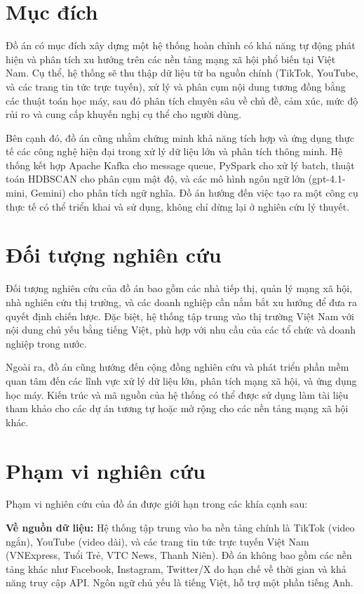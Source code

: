 \section{Mục đích}

Đồ án có mục đích xây dựng một hệ thống hoàn chỉnh có khả năng tự động phát hiện và phân tích xu hướng trên các nền tảng mạng xã hội phổ biến tại Việt Nam. Cụ thể, hệ thống sẽ thu thập dữ liệu từ ba nguồn chính (TikTok, YouTube, và các trang tin tức trực tuyến), xử lý và phân cụm nội dung tương đồng bằng các thuật toán học máy, sau đó phân tích chuyên sâu về chủ đề, cảm xúc, mức độ rủi ro và cung cấp khuyến nghị cụ thể cho người dùng.

Bên cạnh đó, đồ án cũng nhằm chứng minh khả năng tích hợp và ứng dụng thực tế các công nghệ hiện đại trong xử lý dữ liệu lớn và phân tích thông minh. Hệ thống kết hợp Apache Kafka cho message queue, PySpark cho xử lý batch, thuật toán HDBSCAN cho phân cụm mật độ, và các mô hình ngôn ngữ lớn (gpt-4.1-mini, Gemini) cho phân tích ngữ nghĩa. Đồ án hướng đến việc tạo ra một công cụ thực tế có thể triển khai và sử dụng, không chỉ dừng lại ở nghiên cứu lý thuyết.

\section{Đối tượng nghiên cứu}

Đối tượng nghiên cứu của đồ án bao gồm các nhà tiếp thị, quản lý mạng xã hội, nhà nghiên cứu thị trường, và các doanh nghiệp cần nắm bắt xu hướng để đưa ra quyết định chiến lược. Đặc biệt, hệ thống tập trung vào thị trường Việt Nam với nội dung chủ yếu bằng tiếng Việt, phù hợp với nhu cầu của các tổ chức và doanh nghiệp trong nước.

Ngoài ra, đồ án cũng hướng đến cộng đồng nghiên cứu và phát triển phần mềm quan tâm đến các lĩnh vực xử lý dữ liệu lớn, phân tích mạng xã hội, và ứng dụng học máy. Kiến trúc và mã nguồn của hệ thống có thể được sử dụng làm tài liệu tham khảo cho các dự án tương tự hoặc mở rộng cho các nền tảng mạng xã hội khác.

\section{Phạm vi nghiên cứu}

Phạm vi nghiên cứu của đồ án được giới hạn trong các khía cạnh sau:

\textbf{Về nguồn dữ liệu:} Hệ thống tập trung vào ba nền tảng chính là TikTok (video ngắn), YouTube (video dài), và các trang tin tức trực tuyến Việt Nam (VNExpress, Tuổi Trẻ, VTC News, Thanh Niên). Đồ án không bao gồm các nền tảng khác như Facebook, Instagram, Twitter/X do hạn chế về thời gian và khả năng truy cập API. Ngôn ngữ chủ yếu là tiếng Việt, hỗ trợ một phần tiếng Anh.

